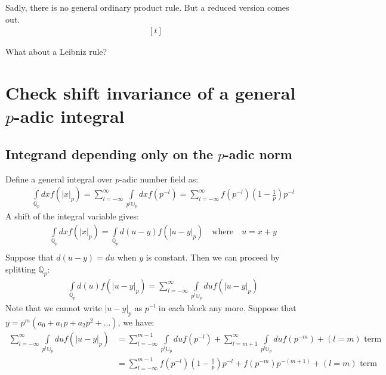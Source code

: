 \documentclass[12pt]{article}
\begin{document}
Sadly, there is no general ordinary product rule. But a reduced version comes out.
\begin{equation}
\begin{aligned}[t]

\end{aligned}
\end{equation}

What about a Leibniz rule?
\section{Check shift invariance of a general $p$-adic integral}
\subsection{Integrand depending only on the $p$-adic norm}
Define a general integral over $p$-adic number field as:
\begin{equation}
\begin{aligned}
&\quad \int\limits_{\mathbb{Q}_p} dx f(|x|_p)=\sum\limits_{l=-\infty}^{\infty}\int\limits_{p^l\mathbb{U}_p}dx f(p^{-l})=\sum\limits_{l=-\infty}^{\infty}f(p^{-l})(1-\frac{1}{p})p^{-l}
\end{aligned}
\end{equation}
A shift of the integral variable gives:
\begin{equation}
\begin{aligned}
&\quad \int\limits_{\mathbb{Q}_p} dx f(|x|_p)=\int\limits_{\mathbb{Q}_p} d(u-y) f(|u-y|_p) \quad\text{where}\quad u=x+y \\
\end{aligned}
\end{equation}
Suppose that $d(u-y)=du$ when $y$ is constant. Then we can proceed by splitting $\mathbb{Q}_p$:
\begin{equation}
\begin{aligned}
&\quad \int\limits_{\mathbb{Q}_p} d(u) f(|u-y|_p)=\sum\limits_{l=-\infty}^{\infty}\int\limits_{p^l\mathbb{U}_p}du f(|u-y|_p)
\end{aligned}
\end{equation}
Note that we cannot write $|u-y|_p$ as $p^{-l}$ in each block any more. Suppose that $y=p^m(a_0+a_1 p+a_2 p^2+...)$, we have:
\begin{equation}
\begin{aligned}
\sum\limits_{l=-\infty}^{\infty}\int\limits_{p^l\mathbb{U}_p}du f(|u-y|_p)&=\sum\limits_{l=-\infty}^{m-1}\int\limits_{p^l\mathbb{U}_p}du f(p^{-l})+\sum\limits_{l=m+1}^{\infty}\int\limits_{p^l\mathbb{U}_p}du f(p^{-m})+(l=m)\text{ term}\\
&=\sum\limits_{l=-\infty}^{m-1}f(p^{-l})(1-\frac{1}{p})p^{-l}+f(p^{-m})p^{-(m+1)}+(l=m)\text{ term}
\end{aligned}
\end{equation}
\end{document}
